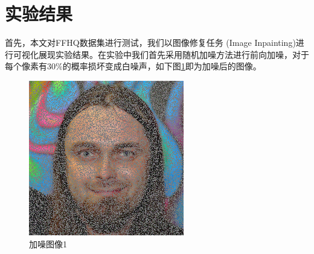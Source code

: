 \section{实验结果}
首先，本文对FFHQ数据集进行测试，我们以图像修复任务 (Image Inpainting)进行可视化展现实验结果。在实验中我们首先采用随机加噪方法进行前向加噪，对于每个像素有30\%的概率损坏变成白噪声，如下图\ref{noised image 1}即为加噪后的图像。 
\begin{figure}[H]
  \centering
  \begin{minipage}[b]{0.3\linewidth}
\includegraphics[width=\linewidth]{Picture/input/00000.png}
    \caption{加噪图像1}
    \label{noised image 1}
  \end{minipage}
  \hspace{0.1cm} %
   \begin{minipage}[b]{0.3\linewidth}

\end{minipage}
\end{figure}
